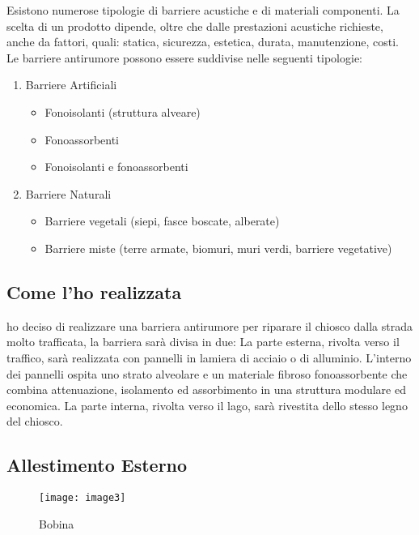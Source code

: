 \noindent
Esistono numerose tipologie di barriere acustiche e di materiali componenti. La scelta di un prodotto dipende, oltre che dalle prestazioni acustiche richieste, anche da fattori, quali: statica, sicurezza, estetica, durata, manutenzione, costi. Le barriere antirumore possono essere suddivise nelle seguenti tipologie: 

\begin{enumerate}
	\item Barriere Artificiali
	\begin{itemize}
		\item Fonoisolanti (struttura alveare)
		\item Fonoassorbenti 
		\item Fonoisolanti e fonoassorbenti
	\end{itemize}
	
	\item Barriere Naturali
	\begin{itemize}
		\item Barriere vegetali (siepi, fasce boscate, alberate) 
		\item Barriere miste (terre armate, biomuri, muri verdi, barriere vegetative)
	\end{itemize}
\end{enumerate}


\subsection{Come l’ho realizzata}

ho deciso di realizzare una barriera antirumore per riparare il chiosco dalla strada molto trafficata, la barriera sarà divisa in due: La parte esterna, rivolta verso il traffico, sarà realizzata con pannelli in lamiera di acciaio o di alluminio. L'interno dei pannelli ospita uno strato alveolare e un materiale fibroso fonoassorbente che combina attenuazione, isolamento ed assorbimento in una struttura modulare ed economica. La parte interna, rivolta verso il lago, sarà rivestita dello stesso legno del chiosco. 

\subsection{Allestimento Esterno}

\begin{wrapfigure}[12]{r}{0.4\textwidth}
	\centering
	\texttt{[image: image3]}
	\caption{Bobina}
\end{wrapfigure}

